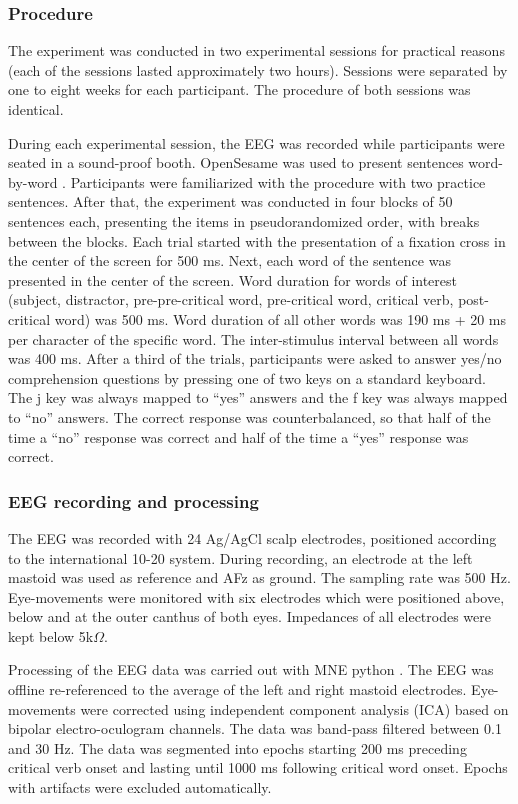 \documentclass[a4paper, man, floatsintext]{apa7}
\begin{document}
\subsubsection{Procedure}
The experiment was conducted in two experimental sessions for practical reasons (each of the sessions lasted approximately two hours). Sessions were separated by one to eight weeks for each participant. The procedure of both sessions was identical.

During each experimental session, the EEG was recorded while participants were
seated in a sound-proof booth. OpenSesame was used to present sentences word-by-word \citep{opensesame}. Participants were familiarized with the procedure with two practice sentences. After that, the experiment was conducted in four blocks of 50 sentences each, presenting the items in pseudorandomized order, with breaks between the blocks. Each trial started with the presentation of a fixation cross in the center of the screen for 500 ms. Next, each word of the sentence was presented in the center of the screen. Word duration for words of interest (subject, distractor, pre-pre-critical word, pre-critical word, critical verb, post-critical word) was 500 ms. Word duration of all other words was 190 ms + 20 ms per character of the specific word. The inter-stimulus interval between all words was 400 ms. After a third of the trials, participants were asked to answer yes/no comprehension questions by pressing one of two keys on a standard keyboard. The j key was always mapped to ``yes'' answers and the f key was always mapped to ``no'' answers. The correct response was counterbalanced, so that half of the time a ``no'' response was correct and half of the time a ``yes'' response was correct. 

\subsubsection{EEG recording and processing}
The EEG was recorded with 24 Ag/AgCl scalp electrodes, positioned according to the international 10-20 system. During recording, an electrode at the left mastoid was used as reference and AFz as ground. The sampling rate was 500 Hz. Eye-movements were monitored with six electrodes which were positioned above, below and at the outer canthus of both eyes. Impedances of all electrodes were kept below 5k$\Omega$.

Processing of the EEG data was carried out with MNE python \citep{mne}. The EEG was offline re-referenced to the average of the left and right mastoid electrodes. Eye-movements were corrected using independent component analysis (ICA) based on bipolar electro-oculogram channels. The data was band-pass filtered between 0.1 and 30 Hz. The data was segmented into epochs starting 200 ms preceding critical verb onset and lasting until 1000 ms following critical word onset. Epochs with artifacts were excluded automatically.
\end{document}
